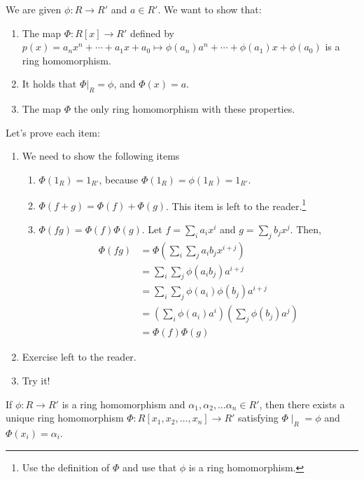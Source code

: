 \begin{dem}
	We are given $\phi: R \to R'$ and $a \in R'$. We want to show that:
	\begin{enumerate}
		\item The map $\Phi : R[x] \to R'$ defined by $p(x) = a_nx^n + \cdots + a_1x + a_0 \mapsto \phi(a_n)a^n + \cdots + \phi(a_1)x + \phi(a_0)$ is a ring homomorphism.
		\item It holds that $\Phi|_R = \phi$, and  $\Phi(x) = a$.
		\item The map $\Phi$ the only ring homomorphism with these properties.
	\end{enumerate}

	Let's prove each item:
	\begin{enumerate}
		\item We need to show the following items
			\begin{enumerate}[label = (\alph*)]
				\item $\Phi(1_R) = 1_{R'}$, because $\Phi(1_R) = \phi(1_R) = 1_{R'}$.
				\item $\Phi(f + g) = \Phi(f) + \Phi(g)$. This item is left to the reader.\footnote{Use the definition of $\Phi$ and use that $\phi$ is a ring homomorphism.}
				\item $\Phi(fg) = \Phi(f)\Phi(g)$. Let $f = \sum_i a_ix^i$ and $g = \sum_j b_jx^j$. Then,
					\begin{align*}
						\Phi(fg) &= \Phi\left(\sum_i \sum_j a_ib_jx^{i+j}\right)\\
								 &= \sum_i\sum_j \phi(a_ib_j)a^{i+j} \\
								 &= \sum_i\sum_j \phi(a_i)\phi(b_j)a^{i+j}\\
								 &= \left(\sum_i \phi(a_i)a^i\right)\left(\sum_j\phi(b_j)a^j\right)\\
								 &= \Phi(f) \Phi(g)
					\end{align*}
			\end{enumerate}
		\item Exercise left to the reader.
		\item Try it!
	\end{enumerate}
\end{dem}

\begin{thm}
	If $\phi: R \to R'$ is a ring homomorphism and $\alpha_1, \alpha_2, \dots \alpha_n \in R'$, then there exists a unique ring homomorphism  $\Phi : R[x_1, x_2, \dots, x_n] \to R'$ satisfying $\Phi\mid_R = \phi$ and  $\Phi(x_i) = \alpha_i$.
\end{thm}

